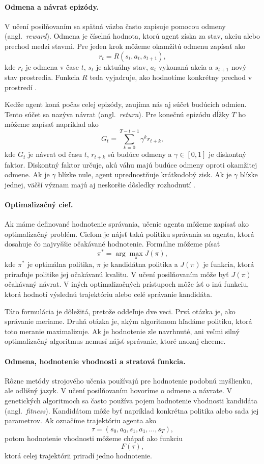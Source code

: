 \paragraph{Odmena a návrat epizódy.}
V učení posilňovaním sa spätná väzba často zapisuje pomocou odmeny (angl.~\emph{reward}). Odmena je číselná hodnota, ktorú agent získa za stav, akciu alebo prechod medzi stavmi. Pre jeden krok môžeme okamžitú odmenu zapísať ako
\[
    r_t = R(s_t, a_t, s_{t+1}),
\]
kde $r_t$ je odmena v čase $t$, $s_t$ je aktuálny stav, $a_t$ vykonaná akcia a $s_{t+1}$ nový stav prostredia. Funkcia $R$ teda vyjadruje, ako hodnotíme konkrétny prechod v prostredí \cite{sutton_barto2018rl}.

Keďže agent koná počas celej epizódy, zaujíma nás aj súčet budúcich odmien. Tento súčet sa nazýva návrat (angl.~\emph{return}). Pre konečnú epizódu dĺžky $T$ ho môžeme zapísať napríklad ako
\[
    G_t = \sum_{k=0}^{T-t-1} \gamma^k r_{t+k},
\]
kde $G_t$ je návrat od času $t$, $r_{t+k}$ sú budúce odmeny a $\gamma \in [0,1]$ je diskontný faktor. Diskontný faktor určuje, akú váhu majú budúce odmeny oproti okamžitej odmene. Ak je $\gamma$ blízke nule, agent uprednostňuje krátkodobý zisk. Ak je $\gamma$ blízke jednej, väčší význam majú aj neskoršie dôsledky rozhodnutí \cite{sutton_barto2018rl}.

\paragraph{Optimalizačný cieľ.}
Ak máme definované hodnotenie správania, učenie agenta môžeme zapísať ako optimalizačný problém. Cieľom je nájsť takú politiku správania sa agenta, ktorá dosahuje čo najvyššie očakávané hodnotenie. Formálne môžeme písať
\[
    \pi^* = \arg\max_{\pi} J(\pi),
\]
kde $\pi^*$ je optimálna politika, $\pi$ je kandidátna politika a $J(\pi)$ je funkcia, ktorá priraďuje politike jej očakávanú kvalitu. V učení posilňovaním môže byť $J(\pi)$ očakávaný návrat. V iných optimalizačných prístupoch môže ísť o inú funkciu, ktorá hodnotí výslednú trajektóriu alebo celé správanie kandidáta.

Táto formulácia je dôležitá, pretože oddeľuje dve veci. Prvá otázka je, ako správanie meriame. Druhá otázka je, akým algoritmom hľadáme politiku, ktorá toto meranie maximalizuje. Ak je hodnotenie zle navrhnuté, ani veľmi silný optimalizačný algoritmus nemusí nájsť správanie, ktoré naozaj chceme.

\paragraph{Odmena, hodnotenie vhodnosti a stratová funkcia.}
Rôzne metódy strojového učenia používajú pre hodnotenie podobnú myšlienku, ale odlišný jazyk. V učení posilňovaním hovoríme o odmene a návrate. V genetických algoritmoch sa často používa pojem hodnotenie vhodnosti kandidáta (angl.~\emph{fitness}). Kandidátom môže byť napríklad konkrétna politika alebo sada jej parametrov. Ak označíme trajektóriu agenta ako
\[
    \tau = (s_0, a_0, s_1, a_1, \ldots, s_T),
\]
potom hodnotenie vhodnosti môžeme chápať ako funkciu
\[
    F(\tau),
\]
ktorá celej trajektórii priradí jedno hodnotenie.

